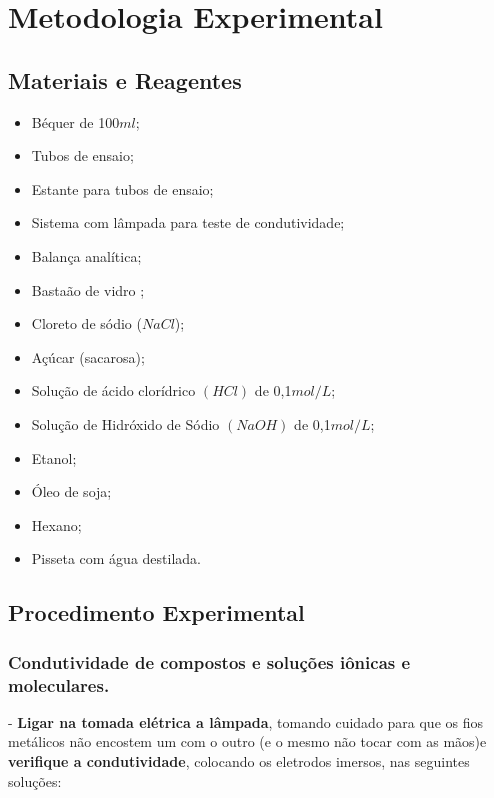 \chapter{Metodologia Experimental}

\section{Materiais e Reagentes}\label{sec:Materiais e Reagentes} %

\begin{itemize}
 \item Béquer de 100$ml$;
 \item Tubos de ensaio;
 \item Estante para tubos de ensaio;
 \item Sistema com lâmpada para teste de condutividade;
 \item Balança analítica;
 \item Bastaão de vidro ;
 \item Cloreto de sódio ($NaCl$);
 \item Açúcar (sacarosa);
 \item Solução de ácido clorídrico $(HCl)$ de 0,1\textbf{$mol/L$};
 \item Solução de Hidróxido de Sódio $(NaOH)$ de 0,1\textbf{$mol/L$};
 \item Etanol;
 \item Óleo de soja;
 \item Hexano;
 \item Pisseta com água destilada.
\end{itemize}

\section{Procedimento Experimental}\label{sec:Procedimento Experimental} %

\subsection{Condutividade de compostos e soluções iônicas e moleculares.}\label{sub:Condutividade de compostos e soluções iônicas e moleculares.} %

- \textbf{Ligar na tomada elétrica a lâmpada}, tomando cuidado para que os fios metálicos não encostem um com o outro (e o mesmo não tocar com as mãos)e \textbf{verifique a condutividade}, colocando os eletrodos imersos, nas seguintes soluções:

